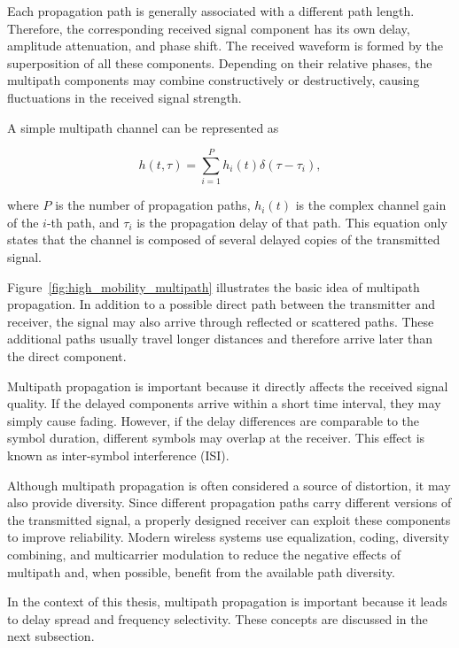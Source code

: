 Each propagation path is generally associated with a different path length. Therefore, the corresponding received signal component has its own delay, amplitude attenuation, and phase shift. The received waveform is formed by the superposition of all these components. Depending on their relative phases, the multipath components may combine constructively or destructively, causing fluctuations in the received signal strength.

A simple multipath channel can be represented as

\begin{equation}
h(t,\tau)=\sum_{i=1}^{P}h_i(t)\delta(\tau-\tau_i),
\end{equation}

where \(P\) is the number of propagation paths, \(h_i(t)\) is the complex channel gain of the \(i\)-th path, and \(\tau_i\) is the propagation delay of that path. This equation only states that the channel is composed of several delayed copies of the transmitted signal.

Figure~\ref{fig:high_mobility_multipath} illustrates the basic idea of multipath propagation. In addition to a possible direct path between the transmitter and receiver, the signal may also arrive through reflected or scattered paths. These additional paths usually travel longer distances and therefore arrive later than the direct component.

Multipath propagation is important because it directly affects the received signal quality. If the delayed components arrive within a short time interval, they may simply cause fading. However, if the delay differences are comparable to the symbol duration, different symbols may overlap at the receiver. This effect is known as inter-symbol interference (ISI).

Although multipath propagation is often considered a source of distortion, it may also provide diversity. Since different propagation paths carry different versions of the transmitted signal, a properly designed receiver can exploit these components to improve reliability. Modern wireless systems use equalization, coding, diversity combining, and multicarrier modulation to reduce the negative effects of multipath and, when possible, benefit from the available path diversity.

In the context of this thesis, multipath propagation is important because it leads to delay spread and frequency selectivity. These concepts are discussed in the next subsection.

